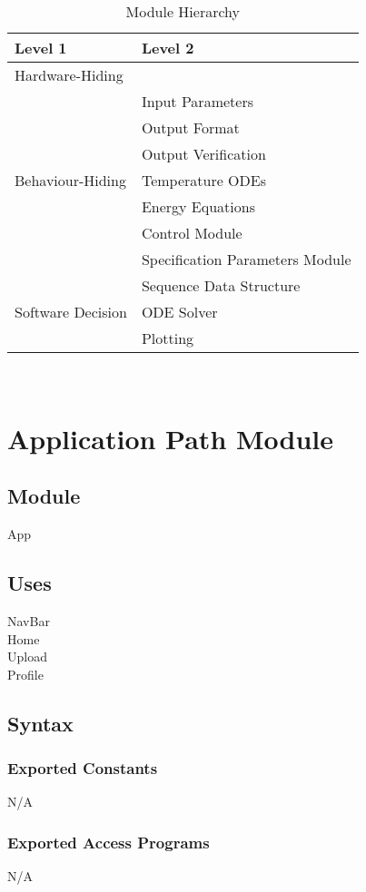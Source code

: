 \documentclass[12pt, titlepage]{article}
\begin{document}
\begin{table}[h!]
\centering
\begin{tabular}{p{} p{}}
\toprule
\textbf{Level 1} & \textbf{Level 2}\\
\midrule

{Hardware-Hiding} & ~ \\
\midrule

\multirow{7}{0.3\textwidth}{Behaviour-Hiding} & Input Parameters\\
& Output Format\\
& Output Verification\\
& Temperature ODEs\\
& Energy Equations\\ 
& Control Module\\
& Specification Parameters Module\\
\midrule

\multirow{3}{0.3\textwidth}{Software Decision} & {Sequence Data Structure}\\
& ODE Solver\\
& Plotting\\
\bottomrule

\end{tabular}
\caption{Module Hierarchy}
\label{TblMH}
\end{table}

\newpage
~\newpage

\section{Application Path Module} \label{App}
\subsection{Module}
App
\subsection{Uses}
NavBar\\
Home\\
Upload\\
Profile
\subsection{Syntax}
\subsubsection{Exported Constants}
N/A
\subsubsection{Exported Access Programs}
N/A
\end{document}
